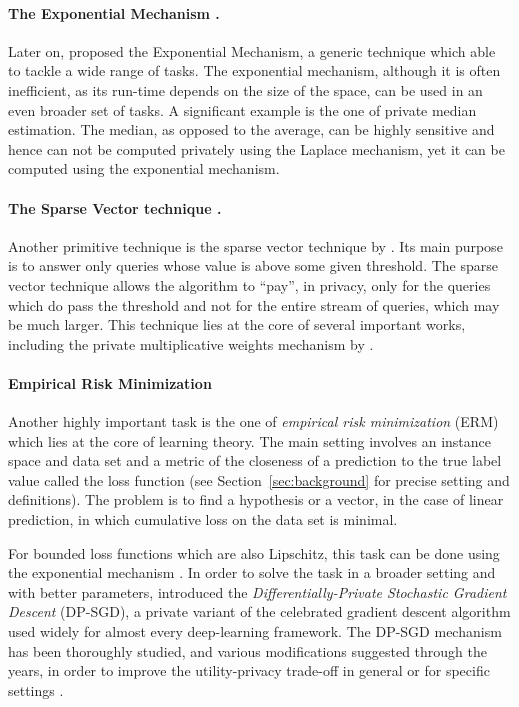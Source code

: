 \documentclass[12pt,a4paper,oneside,onecolumn]{book}
\begin{document}
\paragraph{The Exponential Mechanism \citet{mcsherry2007mechanism}.}
Later on, \citeauthor{mcsherry2007mechanism} proposed the Exponential Mechanism, a generic technique which able to tackle a wide range of tasks. The exponential mechanism, although it is often inefficient, as its run-time depends on the size of the space, can be used in an even broader set of tasks. 
A significant example is the one of private median estimation. The median, as opposed to the average, can be highly sensitive and hence can not be computed privately using the Laplace mechanism, yet it can be computed using the exponential mechanism. 

\paragraph{The Sparse Vector technique \citep{dwork2009complexity}.}
Another primitive technique is the sparse vector technique by \citet{dwork2009complexity}. Its main purpose is to answer only queries whose value is above some given threshold. The sparse vector technique allows the algorithm to “pay”, in privacy, only for the queries which do pass the threshold and not for the entire stream of queries, which may be much larger. 
This technique lies at the core of several important works, including the private multiplicative weights mechanism by \citet{hardt2010multiplicative}. 

\paragraph{Empirical Risk Minimization}
Another highly important task is the one of \emph{empirical risk minimization} (ERM) which lies at the core of learning theory. The main setting involves an instance space and data set and a metric of the closeness of a prediction to the true label value called the loss function (see Section~\ref{sec:background} for precise setting and definitions). 
The problem is to find a hypothesis or a vector, in the case of linear prediction, in which cumulative loss on the data set is minimal. 

For bounded loss functions which are also Lipschitz, this task can be done using the exponential mechanism \citep{DBLP:journals/corr/BassilyST14}. In order to solve the task in a broader setting and with better parameters, \citet{6736861} introduced the \emph{Differentially-Private Stochastic Gradient Descent} (DP-SGD), a private variant of the celebrated gradient descent algorithm used widely for almost every deep-learning framework. 
The DP-SGD mechanism has been thoroughly studied, and various modifications suggested through the years, in order to improve the utility-privacy trade-off in general or for specific settings \citep{Abadi_2016, Wang2019DPLSSGDAS, Jayaraman2019EvaluatingDP, Kairouz2021PracticalAP, Liu2021LowerBF}.
 
\end{document}
